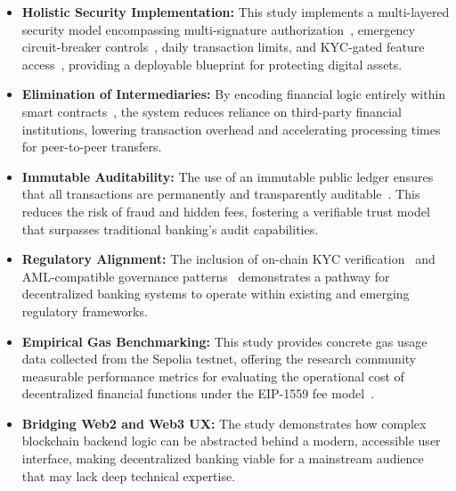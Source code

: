 \documentclass[conference]{IEEEtran}
\begin{document}
\begin{itemize}

  \item \textbf{Holistic Security Implementation:} This study implements a
    multi-layered security model encompassing multi-signature
    authorization~\cite{ref2,ref4}, emergency circuit-breaker
    controls~\cite{ref9}, daily transaction limits, and KYC-gated feature
    access~\cite{ref20}, providing a deployable blueprint for protecting
    digital assets.

  \item \textbf{Elimination of Intermediaries:} By encoding financial logic
    entirely within smart contracts~\cite{ref3,ref7}, the system reduces
    reliance on third-party financial institutions, lowering transaction
    overhead and accelerating processing times for peer-to-peer transfers.

  \item \textbf{Immutable Auditability:} The use of an immutable public ledger
    ensures that all transactions are permanently and transparently
    auditable~\cite{ref1,ref6}. This reduces the risk of fraud and hidden fees,
    fostering a verifiable trust model that surpasses traditional banking's
    audit capabilities.

  \item \textbf{Regulatory Alignment:} The inclusion of on-chain KYC
    verification~\cite{ref20,ref21} and AML-compatible governance
    patterns~\cite{ref5} demonstrates a pathway for decentralized banking
    systems to operate within existing and emerging regulatory frameworks.

  \item \textbf{Empirical Gas Benchmarking:} This study provides concrete gas
    usage data collected from the Sepolia testnet, offering the research
    community measurable performance metrics for evaluating the operational cost
    of decentralized financial functions under the EIP-1559 fee
    model~\cite{ref14,ref10}.

  \item \textbf{Bridging Web2 and Web3 UX:} The study demonstrates how complex
    blockchain backend logic can be abstracted behind a modern, accessible user
    interface, making decentralized banking viable for a mainstream audience
    that may lack deep technical expertise.

\end{itemize}

\end{document}
